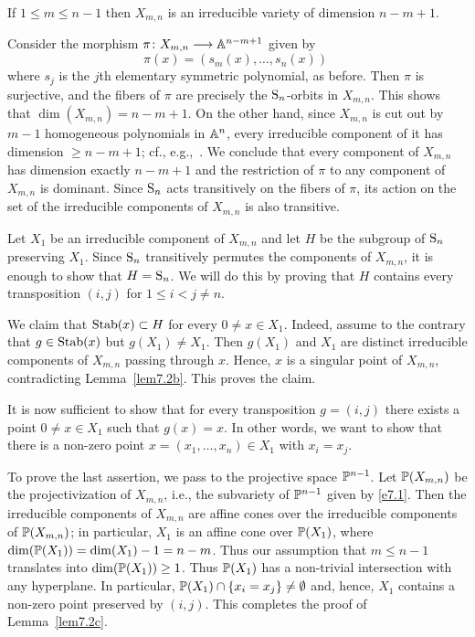 \begin{lem} \label{lem7.2c}
If $1 \leq m \leq n-1$ 
then $X_{m, n}$ is an irreducible variety of dimension $n-m+1$.
\end{lem}

\begin{pf}
Consider the morphism $\pi \colon X_{m,n} \longrightarrow {\Bbb A}^{n-m+1}$ given by
\begin{equation} \label{e7.15}
\pi(x) = (s_m(x), \ldots, s_n(x)) \; 
\end{equation} 
where $s_j$ is the $j$th elementary symmetric polynomial, as before.
Then $\pi$ is
surjective, and the fibers of $\pi$ are precisely the ${\operatorname{S}}_n$-orbits
in $X_{m,n}$. This shows that $\dim(X_{m,n}) = n-m+1$.  On the other hand,
since $X_{m,n}$ is cut out by $m-1$ homogeneous polynomials in ${\Bbb A}^n$, 
every irreducible component of it has dimension $\geq n-m+1$; cf., 
e.g.,~\cite[Proposition I.7.1]{Hart}. We conclude that every component
of $X_{m, n}$ has dimension exactly $n-m+1$ and the restriction of
$\pi$ to any component of $X_{m,n}$ is dominant. Since
${\operatorname{S}}_n$ acts transitively on the fibers of $\pi$, its action on the set of 
the irreducible components of $X_{m,n}$ is also transitive. 

Let $X_1$ be an irreducible component of $X_{m,n}$ and let $H$ be the subgroup
of ${\operatorname{S}}_n$ preserving $X_1$. Since ${\operatorname{S}}_n$ transitively permutes the
components of $X_{m,n}$, it is enough to show that $H = {\operatorname{S}}_n$. We will
do this by proving that $H$ contains every transposition $(i, j)$ for
$1 \leq i < j \neq n$.

We claim that $\operatorname{Stab}(x) \subset H$ for every $0 \neq x \in X_1$. Indeed,
assume to the contrary that $g \in \operatorname{Stab}(x)$ but $g(X_1) \neq X_1$. 
Then $g(X_1)$ and $X_1$ are distinct irreducible components of $X_{m,n}$ 
passing through $x$. Hence, $x$ is a singular point of $X_{m,n}$, 
contradicting Lemma~\ref{lem7.2b}. This proves the claim.

It is now sufficient to show that for every transposition 
$g = (i, j)$ there exists a point $0 \neq x \in X_1$ such that $g(x) = x$. 
In other words, we want to show
that there is a non-zero point $x=(x_1, \ldots, x_n) \in X_1$ with $x_i = x_j$. 

To prove the last assertion, we pass to the projective space ${\Bbb P}^{n-1}$. Let
${\Bbb P}(X_{m,n})$ be the projectivization of $X_{m,n}$, i.e., 
the subvariety of ${\Bbb P}^{n-1}$ given by \eqref{e7.1}. Then the irreducible
components of $X_{m,n}$ are affine cones over the irreducible components
of ${\Bbb P}(X_{m,n})$; in particular, $X_1$ is an affine cone over ${\Bbb P}(X_1)$,
where $\dim({\Bbb P}(X_1))=\dim(X_1) - 1 = n-m$. Thus our assumption that
$m \leq n-1$ translates into $\dim({\Bbb P}(X_1)) \geq 1$. Thus ${\Bbb P}(X_1)$ has
a non-trivial intersection with any hyperplane. In particular,
${\Bbb P}(X_1) \cap \{ x_i = x_j \} \neq \emptyset$ and, hence,
$X_1$ contains a non-zero point preserved by $(i, j)$.
This completes the proof of Lemma~\ref{lem7.2c}.
\end{pf}

